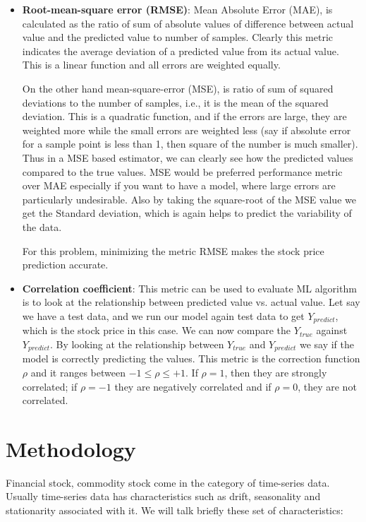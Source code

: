 \documentclass[12pt]{article}
\begin{document}
\begin{itemize}
\begin{itemize}
\item \textbf{Root-mean-square error (RMSE)}: Mean Absolute Error (MAE), is calculated as the ratio of sum of absolute values of difference between actual value and the predicted value to number of samples. Clearly this metric indicates the average deviation of a predicted value from its actual value. This is a linear function and all errors are weighted equally.

On the other hand mean-square-error (MSE), is ratio of sum of squared deviations to the number of samples, i.e., it is the mean of the squared deviation. This is a quadratic function, and if the errors are large, they are weighted more while the small errors are weighted less (say if absolute error for a sample point is less than 1, then square of the number is much smaller). Thus in a MSE based estimator, we can clearly see how the predicted values compared to the true values. MSE would be preferred performance metric over MAE especially if you want to have a model, where large errors are particularly undesirable.  Also by taking the square-root of the MSE value we get the Standard deviation, which is again helps to predict the variability of the data. 

For this problem, minimizing the metric RMSE makes the stock price prediction accurate.
\item  \textbf{Correlation coefficient}: This metric can be used to evaluate ML algorithm is to look at the relationship between predicted value vs. actual value. Let say we have a test data, and we run our model again test data to get $Y_{predict}$, which is the stock price in this case. We can now compare the $Y_{true}$ against $Y_{predict}$. By looking at the relationship between  $Y_{true}$ and $Y_{predict}$ we say if the model is correctly predicting the values. This metric is the correction function $\rho$ and it ranges between $-1 \leq \rho \leq +1$. If $\rho=1$, then they are strongly correlated; if $\rho=-1$ they are negatively correlated and if $\rho=0$, they are not correlated. 
\end{itemize}


\section{Methodology}
\label{sec:method}
Financial stock, commodity stock come in the category of time-series data. Usually time-series data has characteristics such as drift, seasonality and stationarity associated with it. We will talk briefly these set of characteristics:


\end{itemize}
\end{document}
